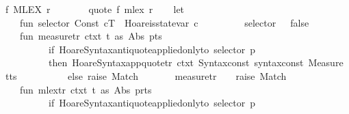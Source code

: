 \begin{isabellebody}
\ {\isachardoublequoteopen}f\ {\isacharless}{\isacharasterisk}MLEX{\isacharasterisk}{\isachargreater}\ r{\isachardoublequoteclose}\ \ \ \ \ \ \ {\isacharequal}{\isachargreater}\ {\isachardoublequoteopen}{\isacharparenleft}{\isacharunderscore}quote\ f{\isacharparenright}\ {\isacharless}{\isacharasterisk}mlex{\isacharasterisk}{\isachargreater}\ r{\isachardoublequoteclose}\isanewline
\isanewline
\isanewline
%
\isadelimML
\isanewline
%
\endisadelimML
%
\isatagML
{}\isamarkupfalse%
\ {\isacartoucheopen}\isanewline
\ \ let\isanewline
\ \ \ \ fun\ selector\ {\isacharparenleft}Const\ {\isacharparenleft}c{\isacharcomma}T{\isacharparenright}{\isacharparenright}\ {\isacharequal}\ Hoare{\isachardot}is{\isacharunderscore}state{\isacharunderscore}var\ c\ \ \isanewline
\ \ \ \ \ \ {\isacharbar}\ selector\ {\isacharunderscore}\ {\isacharequal}\ false{\isacharsemicolon}\isanewline
\isanewline
\ \ \ \ fun\ measure{\isacharunderscore}tr{\isacharprime}\ ctxt\ {\isacharparenleft}{\isacharparenleft}t\ as\ {\isacharparenleft}Abs\ {\isacharparenleft}{\isacharunderscore}{\isacharcomma}{\isacharunderscore}{\isacharcomma}p{\isacharparenright}{\isacharparenright}{\isacharparenright}{\isacharcolon}{\isacharcolon}ts{\isacharparenright}\ {\isacharequal}\isanewline
\ \ \ \ \ \ \ \ \ \ if\ Hoare{\isacharunderscore}Syntax{\isachardot}antiquote{\isacharunderscore}applied{\isacharunderscore}only{\isacharunderscore}to\ selector\ p\isanewline
\ \ \ \ \ \ \ \ \ \ then\ Hoare{\isacharunderscore}Syntax{\isachardot}app{\isacharunderscore}quote{\isacharunderscore}tr{\isacharprime}\ ctxt\ {\isacharparenleft}Syntax{\isachardot}const\ {\isacharat}{\isacharbraceleft}syntax{\isacharunderscore}const\ {\isachardoublequote}{\isacharunderscore}Measure{\isachardoublequote}{\isacharbraceright}{\isacharparenright}\ {\isacharparenleft}t{\isacharcolon}{\isacharcolon}ts{\isacharparenright}\isanewline
\ \ \ \ \ \ \ \ \ \ else\ raise\ Match\isanewline
\ \ \ \ \ \ {\isacharbar}\ measure{\isacharunderscore}tr{\isacharprime}\ {\isacharunderscore}\ {\isacharunderscore}\ {\isacharequal}\ raise\ Match\isanewline
\isanewline
\ \ \ \ fun\ mlex{\isacharunderscore}tr{\isacharprime}\ ctxt\ {\isacharparenleft}{\isacharparenleft}t\ as\ {\isacharparenleft}Abs\ {\isacharparenleft}{\isacharunderscore}{\isacharcomma}{\isacharunderscore}{\isacharcomma}p{\isacharparenright}{\isacharparenright}{\isacharparenright}{\isacharcolon}{\isacharcolon}r{\isacharcolon}{\isacharcolon}ts{\isacharparenright}\ {\isacharequal}\isanewline
\ \ \ \ \ \ \ \ \ \ if\ Hoare{\isacharunderscore}Syntax{\isachardot}antiquote{\isacharunderscore}applied{\isacharunderscore}only{\isacharunderscore}to\ selector\ p\isanewline

\end{isabellebody}
